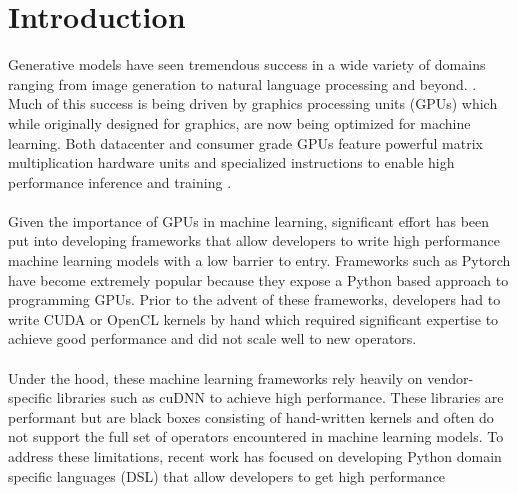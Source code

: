 \documentclass{article}
\begin{document}


\printAffiliationsAndNotice{\mlsysEqualContribution} %

\section{Introduction}
Generative models have seen tremendous success in a wide variety of
domains ranging from image generation to natural language processing and beyond.
\cite{podell_sdxl_2023,dubey_llama_2024}. Much of this success is being
driven by graphics processing units (GPUs) which while originally
designed for graphics, are now being optimized for machine learning.
Both datacenter and consumer grade GPUs feature powerful matrix multiplication hardware units
and specialized instructions to enable high performance inference and training \cite{sun_dissecting_2023}.
\\ \\
Given the importance of GPUs in machine learning, significant
effort has been put into developing frameworks that allow developers to
write high performance machine learning models with a low barrier to entry. Frameworks such
as Pytorch \cite{paszke_pytorch_2019} have become extremely popular
because they expose a Python based approach to programming GPUs. Prior
to the advent of these frameworks, developers had to write CUDA or OpenCL
kernels by hand which required significant expertise to achieve
good performance and did not scale well to new operators.
\\ \\
Under the hood, these machine learning frameworks rely heavily
on vendor-specific libraries such as cuDNN \cite{chetlur_cudnn_2014} to achieve high performance.
These libraries are performant but are black boxes consisting of
hand-written kernels and often do not support the full set of
operators encountered in machine learning models.
To address these limitations, recent work has focused on developing
Python domain specific languages (DSL) that allow developers to get high performance
\end{document}
